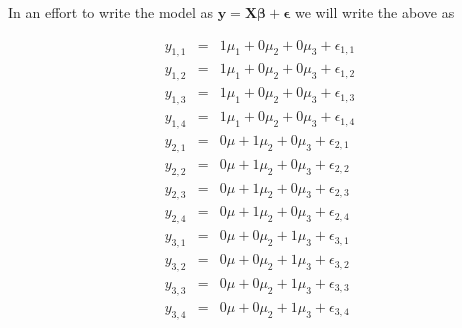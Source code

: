 \documentclass[]{book}
\theoremstyle{definition}
\theoremstyle{definition}
\theoremstyle{remark}
\begin{document}
In an effort to write the model as
\(\boldsymbol{y}=\boldsymbol{X}\boldsymbol{\beta}+\boldsymbol{\epsilon}\)
we will write the above as

\begin{eqnarray*}
y_{1,1} & = & 1\mu_{1}+0\mu_{2}+0\mu_{3}+\epsilon_{1,1}\\
y_{1,2} & = & 1\mu_{1}+0\mu_{2}+0\mu_{3}+\epsilon_{1,2}\\
y_{1,3} & = & 1\mu_{1}+0\mu_{2}+0\mu_{3}+\epsilon_{1,3}\\
y_{1,4} & = & 1\mu_{1}+0\mu_{2}+0\mu_{3}+\epsilon_{1,4}\\
y_{2,1} & = & 0\mu+1\mu_{2}+0\mu_{3}+\epsilon_{2,1}\\
y_{2,2} & = & 0\mu+1\mu_{2}+0\mu_{3}+\epsilon_{2,2}\\
y_{2,3} & = & 0\mu+1\mu_{2}+0\mu_{3}+\epsilon_{2,3}\\
y_{2,4} & = & 0\mu+1\mu_{2}+0\mu_{3}+\epsilon_{2,4}\\
y_{3,1} & = & 0\mu+0\mu_{2}+1\mu_{3}+\epsilon_{3,1}\\
y_{3,2} & = & 0\mu+0\mu_{2}+1\mu_{3}+\epsilon_{3,2}\\
y_{3,3} & = & 0\mu+0\mu_{2}+1\mu_{3}+\epsilon_{3,3}\\
y_{3,4} & = & 0\mu+0\mu_{2}+1\mu_{3}+\epsilon_{3,4}
\end{eqnarray*}
\end{document}
